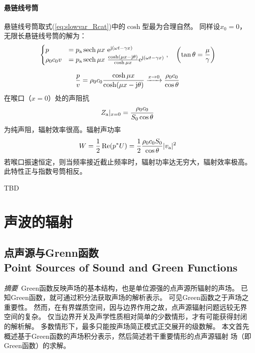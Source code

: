 \documentclass[UTF8]{ctexbook}
\let\stdsection\section
\renewcommand\section{\newpage\stdsection}
\begin{document}
\subsubsection{悬链线号筒}
悬链线号筒取式(\ref{eq:slowvar_Rcat})中的$\cosh$型最为合理自然。
同样设$x_0=0$，无限长悬链线号筒的解为：
\begin{equation}
	\begin{cases}
	p&=p\st{a}\sech \mu x \ \me^{\mj (\omega t-\gamma x)}\\
	\rho_0 c_0 v & = p\st{a} \sech \mu x\ \frac{
	\cosh (\mu x-\mj \theta)}{\cosh \mu x} \me^{\mj(\omega t-\gamma x)}
	\end{cases}
	\qc 
	\qty(\tan \theta = \frac{\mu}{\gamma })
\end{equation}

\begin{equation}
	\frac{p}{v} = \rho_0c_0 \frac{\cosh \mu x}{\cosh (\mu x-\mathrm{j} \theta)}
	\xrightarrow{x\to 0} \frac{\rho_0c_0}{\cos\theta}
\end{equation}
在喉口（$x=0$）处的声阻抗
$$Z_\text{a}|_{x=0} = \frac{\rho_0c_0}{S_0\cos\theta}$$
为纯声阻，辐射效率很高。辐射声功率
$$W = \frac12 \Re (p^*U) = \frac{1}{2}\frac{\rho_0c_0S_0}{\cos\theta}
|v_\text{a}|^2$$
若喉口振速恒定，则当频率接近截止频率时，辐射功率达无穷大，辐射效率极高。
此特性正与指数号筒相反。

TBD

\chapter{声波的辐射}

\section{点声源与Grenn函数\\
Point Sources of Sound and Green Functions}

\emph{摘要}\ 
Green函数反映声场的基本结构，也是单位源强的点声源所辐射的声场。
已知Green函数，就可通过积分法获取声场的解析表示。
可见Green函数之于声场之重要性。
然而，在有界媒质空间，因与边界作用之故，点声源辐射问题远较无界空间的复杂。
仅当边界开关及声学性质相对简单的少数情形，才有可能获得封闭的解析解。
多数情形下，最多只能按声场简正模式正交展开的级数解。
本文首先概述基于Green函数的声场积分表示，然后简述若干重要情形的点声源辐射
场（即Green函数）的求解。
\end{document}
